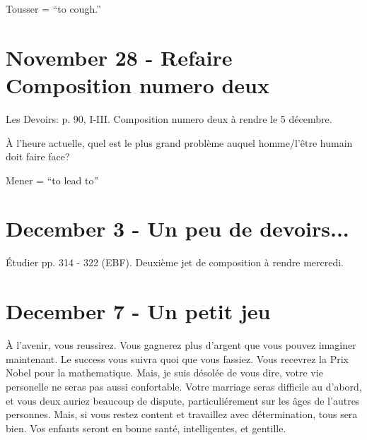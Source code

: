 \documentclass{report}
\begin{document}
Tousser = ``to cough.''

\section{November 28 - Refaire Composition numero deux}

Les Devoirs: p. 90, I-III. Composition numero deux \`a rendre le 5 d\'ecembre.

\`A l'heure actuelle, quel est le plus grand probl\`eme auquel homme/l'\^etre humain doit faire face? 

Mener = ``to lead to''

\section{December 3 - Un peu de devoirs...}

\'Etudier pp. 314 - 322 (EBF). Deuxi\`eme jet de composition \`a rendre mercredi. 

\section{December 7 - Un petit jeu}

\`A l'avenir, vous reussirez. Vous gagnerez plus d'argent que vous pouvez imaginer maintenant. Le success vous suivra quoi que vous fassiez. Vous recevrez la Prix Nobel pour la mathematique. Mais, je suis d\'esol\'ee de vous dire, votre vie personelle ne seras pas aussi confortable. Votre marriage seras difficile au d'abord, et vous deux auriez beaucoup de dispute, particuli\'erement sur les \^ages de l'autres personnes. Mais, si vous restez content et travaillez avec d\'etermination, tous sera bien. Vos enfants seront en bonne sant\'e, intelligentes, et gentille. 
\end{document}
